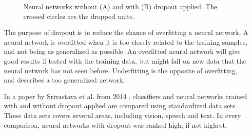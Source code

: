 \begin{figure}[H]
\begin{subfigure}{1\textwidth}
    \caption{}
    \label{fig:net_with_dropout}
    \end{subfigure}
\caption{Neural networks without (A) and with (B) dropout applied. The crossed circles are the dropped units.}
\label{fig:dropout_comparison}
\end{figure}

The purpose of dropout is to reduce the chance of overfitting a neural network. A neural network is overfitted when it is too closely related to the training samples, and not being as generalized as possible. An overfitted neural network will give good results if tested with the training data, but might fail on new data that the neural network has not seen before. Underfitting is the opposite of overfitting, and describes a too generalized network.

In a paper by Srivastava et al. from 2014 \cite{srivastava_dropout:_2014}, classifiers and neural networks trained with and without dropout applied are compared using standardized data sets. These data sets covers several areas, including vision, speech and text. In every comparison, neural networks with dropout was ranked high, if not highest.

